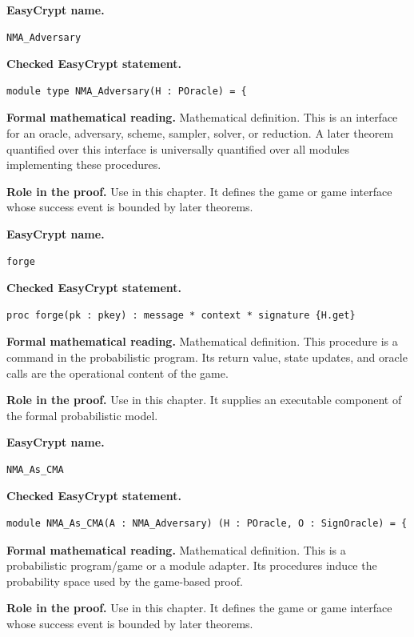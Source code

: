 \begin{formaldefinition}
\noindent\textbf{EasyCrypt name.}
\begin{lstlisting}[language=EasyCrypt,basicstyle=\ttfamily\scriptsize]
NMA_Adversary
\end{lstlisting}
\noindent\textbf{Checked EasyCrypt statement.}
\begin{lstlisting}[language=EasyCrypt,basicstyle=\ttfamily\scriptsize]
module type NMA_Adversary(H : POracle) = {
\end{lstlisting}
\noindent\textbf{Formal mathematical reading.}
Mathematical definition. This is an interface for an oracle, adversary, scheme, sampler, solver, or reduction.  A later theorem quantified over this interface is universally quantified over all modules implementing these procedures.

\noindent\textbf{Role in the proof.}
Use in this chapter. It defines the game or game interface whose success event is bounded by later theorems.

\end{formaldefinition}

\begin{formaldefinition}
\noindent\textbf{EasyCrypt name.}
\begin{lstlisting}[language=EasyCrypt,basicstyle=\ttfamily\scriptsize]
forge
\end{lstlisting}
\noindent\textbf{Checked EasyCrypt statement.}
\begin{lstlisting}[language=EasyCrypt,basicstyle=\ttfamily\scriptsize]
proc forge(pk : pkey) : message * context * signature {H.get}
\end{lstlisting}
\noindent\textbf{Formal mathematical reading.}
Mathematical definition. This procedure is a command in the probabilistic program.  Its return value, state updates, and oracle calls are the operational content of the game.

\noindent\textbf{Role in the proof.}
Use in this chapter. It supplies an executable component of the formal probabilistic model.

\end{formaldefinition}

\begin{formaldefinition}
\noindent\textbf{EasyCrypt name.}
\begin{lstlisting}[language=EasyCrypt,basicstyle=\ttfamily\scriptsize]
NMA_As_CMA
\end{lstlisting}
\noindent\textbf{Checked EasyCrypt statement.}
\begin{lstlisting}[language=EasyCrypt,basicstyle=\ttfamily\scriptsize]
module NMA_As_CMA(A : NMA_Adversary) (H : POracle, O : SignOracle) = {
\end{lstlisting}
\noindent\textbf{Formal mathematical reading.}
Mathematical definition. This is a probabilistic program/game or a module adapter.  Its procedures induce the probability space used by the game-based proof.

\noindent\textbf{Role in the proof.}
Use in this chapter. It defines the game or game interface whose success event is bounded by later theorems.

\end{formaldefinition}

